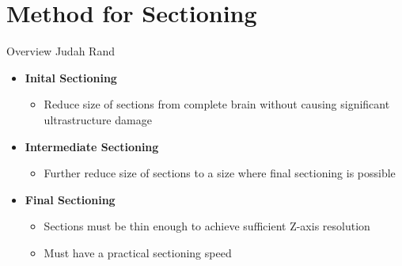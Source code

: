\documentclass[10pt]{beamer}
\begin{document}
\section{Method for Sectioning}
\begin{frame}{Overview \hspace{0pt plus 1 filll} \small{Judah Rand}}
	\begin{itemize}[label={$\bullet$}]
		\item \textbf{Inital Sectioning}
		\begin{itemize}[label={$\bullet$}]
			\item Reduce size of sections from complete brain without causing significant ultrastructure damage
		\end{itemize}
		\item \textbf{Intermediate Sectioning}
		\begin{itemize}[label={$\bullet$}]
			\item Further reduce size of sections to a size where final sectioning is possible
		\end{itemize}
		\item \textbf{Final Sectioning}
		\begin{itemize}[label={$\bullet$}]
			\item Sections must be thin enough to achieve sufficient Z-axis resolution
			\item Must have a practical sectioning speed
		\end{itemize}
	\end{itemize}		
\end{frame}
\end{document}
